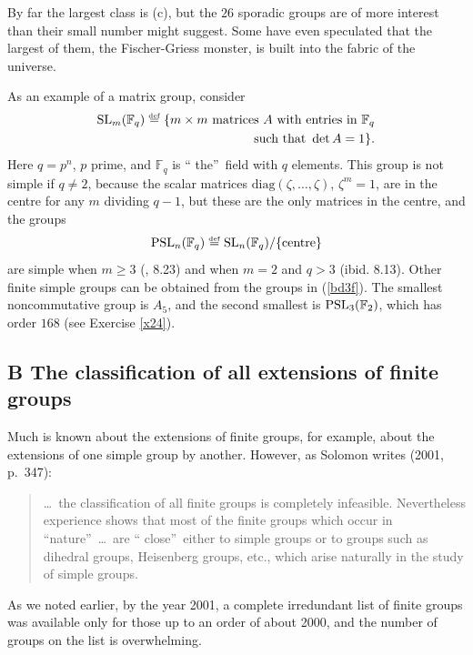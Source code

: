\documentclass[a4paper,11pt,final,openany]{memoir}%
\theoremstyle{nonumberplain}
\begin{document}
By far the largest class is (c), but the $26$ sporadic groups are of more
interest than their small number might suggest. Some have even speculated that
the largest of them, the Fischer-Griess monster, is built into the fabric of
the universe.

As an example of a matrix group, consider
\begin{align*}
\SL_{m}(\mathbb{F}_{q})\overset{\df}{=}\{m\times m\text{
matrices $A$ with entries in }\mathbb{F}_{q}\\
\text{ such that }\det A=1\}.
\end{align*}
Here $q=p^{n}$, $p$ prime, and $\mathbb{F}_{q}$ is \textquotedblleft
the\textquotedblright\ field with $q$ elements. This group is not simple if
$q\neq2$, because the scalar matrices $\text{diag}(\zeta,\ldots,\zeta)$,
$\zeta^{m}=1$, are in the centre for any $m$ dividing $q-1$, but these are the
only matrices in the centre, and the groups%
\[
\text{PSL}_{n}(\mathbb{F}_{q})\overset{\df}{=}\SL_{n}%
(\mathbb{F}_{q})/\{\text{centre}\}
\]
are simple when $m\geq3$ (\cite{rotman1995}, 8.23) and when $m=2$ and $q>3$
(ibid. 8.13). Other finite simple groups can be obtained from the groups in
(\ref{bd3f}). The smallest noncommutative group is $A_{5}$, and the second
smallest is $\operatorname{PSL}_{3}(\mathbb{F}{}_{2})$, which has order $168$ (see Exercise
\ref{x24}).

\subsection{B The classification of all extensions of finite groups}

Much is known about the extensions of finite groups, for example, about the
extensions of one simple group by another. However, as Solomon writes (2001, p.~347):

\begin{quote}
\ldots\ the classification of all finite groups is completely infeasible.
Nevertheless experience shows that most of the finite groups which occur in
\textquotedblleft nature\textquotedblright\ \ldots\ are \textquotedblleft
close\textquotedblright\ either to simple groups or to groups such as dihedral
groups, Heisenberg groups, etc., which arise naturally in the study of simple groups.
\end{quote}

\noindent As we noted earlier, by the year 2001, a complete irredundant list
of finite groups was available only for those up to an order of about 2000,
and the number of groups on the list is overwhelming.
\end{document}
